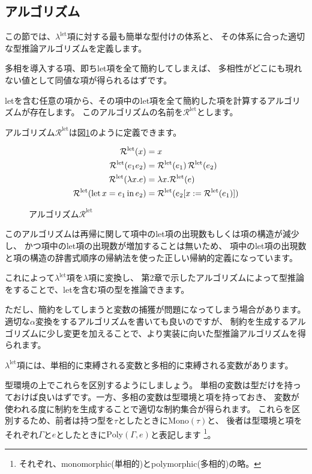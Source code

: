 \subsection{アルゴリズム}

この節では、$\lambda^\mathrm{let}$項に対する最も簡単な型付けの体系と、
その体系に合った適切な型推論アルゴリズムを定義します。

多相を導入する項、即ちlet項を全て簡約してしまえば、
多相性がどこにも現れない値として同値な項が得られるはずです。

letを含む任意の項から、その項中のlet項を全て簡約した項を計算するアルゴリズムが存在します。
このアルゴリズムの名前を$\mathcal R^\mathrm{let}$とします。

アルゴリズム$\mathcal R^\mathrm{let}$は図\ref{fig:algorithm-rlet}のように定義できます。

\begin{figure}[htbp]
  \begin{align*}
    \mathcal R^\mathrm{let}(x) &= x \\
    \mathcal R^\mathrm{let}(e_1 e_2) &=
      \mathcal R^\mathrm{let}(e_1) \, \mathcal R^\mathrm{let}(e_2) \\
    \mathcal R^\mathrm{let}(\lambda x . e) &=
      \lambda x . \mathcal R^\mathrm{let}(e) \\
    \mathcal R^\mathrm{let}(\mathrm{let} \, x = e_1 \, \mathrm{in} \, e_2) &=
      \mathcal R^\mathrm{let}(e_2 [x := \mathcal R^\mathrm{let}(e_1)])
  \end{align*}
  \caption{アルゴリズム$\mathcal R^\mathrm{let}$}
  \label{fig:algorithm-rlet}
\end{figure}

このアルゴリズムは再帰に関して項中のlet項の出現数もしくは項の構造が減少し、
かつ項中のlet項の出現数が増加することは無いため、
項中のlet項の出現数と項の構造の辞書式順序の帰納法を使った正しい帰納的定義になっています。

これによって$\lambda^\mathrm{let}$項を$\lambda$項に変換し、
第2章で示したアルゴリズムによって型推論をすることで、letを含む項の型を推論できます。

ただし、簡約をしてしまうと変数の捕獲が問題になってしまう場合があります。
適切な$\alpha$変換をするアルゴリズムを書いても良いのですが、
制約を生成するアルゴリズムに少し変更を加えることで、より実装に向いた型推論アルゴリズムを得られます。

$\lambda^\mathrm{let}$項には、単相的に束縛される変数と多相的に束縛される変数があります。

型環境の上でこれらを区別するようにしましょう。
単相の変数は型だけを持っておけば良いはずです。一方、多相の変数は型環境と項を持っておき、
変数が使われる度に制約を生成することで適切な制約集合が得られます。
これらを区別するため、前者は持つ型を$\tau$としたときに$\mathrm{Mono}(\tau)$と、
後者は型環境と項をそれぞれ$\Gamma$と$e$としたときに$\mathrm{Poly}(\Gamma, e)$と表記します
\footnote{それぞれ、monomorphic(単相的)とpolymorphic(多相的)の略。}。


